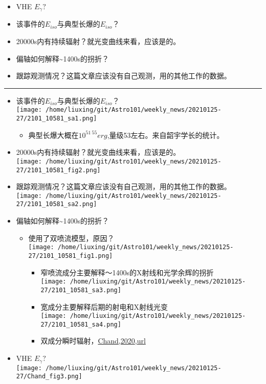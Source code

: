 \documentclass[
]{article}
\begin{document}
\begin{itemize}
\item
  VHE \(E_{\gamma}?\)
\item
  该事件的\(E_{iso}\)与典型长爆的\(E_{iso}\)？
\item
  20000s内有持续辐射？就光变曲线来看，应该是的。
\item
  偏轴如何解释\textasciitilde1400s的拐折？
\item
  跟踪观测情况？这篇文章应该没有自己观测，用的其他工作的数据。
\end{itemize}

\begin{center}\rule{0.5\linewidth}{0.5pt}\end{center}

\begin{itemize}
\item
  该事件的\(E_{iso}\)与典型长爆的\(E_{iso}\)？\\
  \texttt{[image: /home/liuxing/git/Astro101/weekly\_news/20210125-27/2101\_10581\_sa1.png]}

  \begin{itemize}
  \item
    典型长爆大概在\(10^{51~55} erg\),量级53左右。来自韶宇学长的统计。
  \end{itemize}
\item
  20000s内有持续辐射？就光变曲线来看，应该是的。\\
  \texttt{[image: /home/liuxing/git/Astro101/weekly\_news/20210125-27/2101\_10581\_fig2.png]}
\item
  跟踪观测情况？这篇文章应该没有自己观测，用的其他工作的数据。\\
  \texttt{[image: /home/liuxing/git/Astro101/weekly\_news/20210125-27/2101\_10581\_sa2.png]}
\item
  偏轴如何解释\textasciitilde1400s的拐折？

  \begin{itemize}
  \item
    使用了双喷流模型，原因？\\
    \texttt{[image: /home/liuxing/git/Astro101/weekly\_news/20210125-27/2101\_10581\_fig1.png]}

    \begin{itemize}
    \item
      窄喷流成分主要解释～1400s的X射线和光学余辉的拐折\\
      \texttt{[image: /home/liuxing/git/Astro101/weekly\_news/20210125-27/2101\_10581\_sa3.png]}
    \item
      宽成分主要解释后期的射电和X射线光变\\
      \texttt{[image: /home/liuxing/git/Astro101/weekly\_news/20210125-27/2101\_10581\_sa4.png]}
    \item
      双成分瞬时辐射，\href{Chand_2020_ApJ_898_42.pdf}{Chand,2020},\href{https://iopscience.iop.org/article/10.3847/1538-4357/ab9606/pdf}{url}
    \end{itemize}
  \end{itemize}
\item
  VHE \(E_{\gamma}?\)\\
  \texttt{[image: /home/liuxing/git/Astro101/weekly\_news/20210125-27/Chand\_fig3.png]}
\end{itemize}
\end{document}
